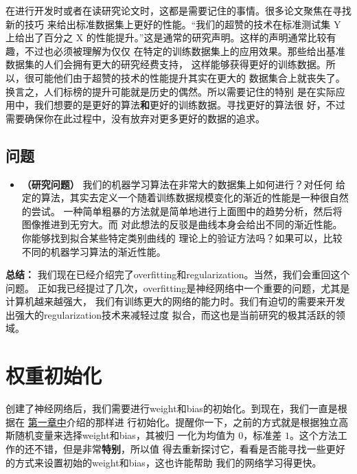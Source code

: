 在进行开发时或者在读研究论文时，这都是需要记住的事情。很多论文聚焦在寻找新的技巧
来给出标准数据集上更好的性能。“我们的超赞的技术在标准测试集 Y 上给出了百分之 X
的性能提升。”这是通常的研究声明。这样的声明通常比较有趣，不过也必须被理解为仅仅
在特定的训练数据集上的应用效果。那些给出基准数据集的人们会拥有更大的研究经费支持，
这样能够获得更好的训练数据。所以，很可能他们由于超赞的技术的性能提升其实在更大的
数据集合上就丧失了。换言之，人们标榜的提升可能就是历史的偶然。所以需要记住的特别
是在实际应用中，我们想要的是更好的算法\textbf{和}更好的训练数据。寻找更好的算法很
好，不过需要确保你在此过程中，没有放弃对更多更好的数据的追求。

\subsection*{问题}

\begin{itemize}
\item \textbf{（研究问题）} 我们的机器学习算法在非常大的数据集上如何进行？对任何
  给定的算法，其实去定义一个随着训练数据规模变化的渐近的性能是一种很自然的尝试。
  一种简单粗暴的方法就是简单地进行上面图中的趋势分析，然后将图像推进到无穷大。而
  对此想法的反驳是曲线本身会给出不同的渐近性能。你能够找到拟合某些特定类别曲线的
  理论上的验证方法吗？如果可以，比较不同的机器学习算法的渐近性能。
\end{itemize}

\textbf{总结：} 我们现在已经介绍完了\gls*{overfitting}和\gls*{regularization}。当然，我们会重回这个问题。
正如我已经提过了几次，\gls*{overfitting}是神经网络中一个重要的问题，尤其是计算机越来越强大，
我们有训练更大的网络的能力时。我们有迫切的需要来开发出强大的\gls*{regularization}技术来减轻过度
拟合，而这也是当前研究的极其活跃的领域。

\section{权重初始化}
\label{sec:weight_initialization}

创建了神经网络后，我们需要进行\gls*{weight}和\gls*{bias}的初始化。到现在，我们一直是根据在%
\hyperref[ch:UsingNeuralNetsToRecognizeHandwrittenDigits]{第一章中}介绍的那样进
行初始化。提醒你一下，之前的方式就是根据独立高斯随机变量来选择\gls*{weight}和\gls*{bias}，其被归
一化为均值为 $0$，标准差 $1$。这个方法工作的还不错，但是非常\textbf{特别}，所以值
得去重新探讨它，看看是否能寻找一些更好的方式来设置初始的\gls*{weight}和\gls*{bias}，这也许能帮助
我们的网络学习得更快。

